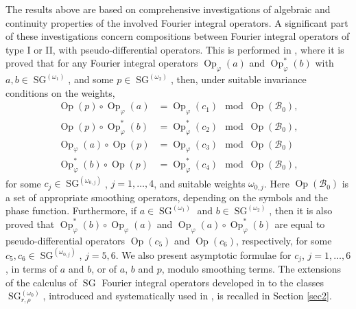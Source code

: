 \documentclass[12pt,a4paper,reqno]{amsart}
\numberwithin{equation}{section}
\numberwithin{thm}{section}
\theoremstyle{definition}
\theoremstyle{remark}
\begin{document}
\medskip

The results above are based on comprehensive investigations of algebraic and
continuity properties of the involved Fourier integral operators. A significant
part of these investigations concern compositions between Fourier integral
operators of type I or II, with pseudo-differential operators. This is performed in
\cite{CoTo2}, where it is proved that for any Fourier integral operators
${\operatorname{Op}} _{\varphi} (a)$ and ${\operatorname{Op}} _{\varphi} ^*(b)$  with $a,b\in {\operatorname{SG}} ^{(\omega _1)}$, and some
$p\in {\operatorname{SG}} ^{(\omega_2 )}$, then, under suitable invariance conditions on the weights,
\begin{align*}
{\operatorname{Op}} (p)\circ {\operatorname{Op}} _{\varphi} (a) &= {\operatorname{Op}} _{\varphi} (c_1) \mod {\operatorname{Op}} ({{\mathcal B}} _0),
\\[1ex]
{\operatorname{Op}} (p)\circ {\operatorname{Op}} _{\varphi} ^*(b) &= {\operatorname{Op}} _{\varphi} ^*(c_2) \mod {\operatorname{Op}} ({{\mathcal B}} _0),
\\[1ex]
{\operatorname{Op}} _{\varphi} (a) \circ {\operatorname{Op}} (p) &= {\operatorname{Op}} _{\varphi} (c_3) \mod {\operatorname{Op}} ({{\mathcal B}} _0)
\\[1ex]
{\operatorname{Op}} _{\varphi} ^*(b) \circ {\operatorname{Op}} (p) &= {\operatorname{Op}} _{\varphi} ^*(c_4) \mod {\operatorname{Op}} ({{\mathcal B}} _0),
\end{align*}
for some $c_j\in {\operatorname{SG}} ^{(\omega_{0,j})}$, $j=1,\dots ,4$, and suitable weights
$\omega_{0,j}$. Here ${\operatorname{Op}} ({{\mathcal B}} _0)$
is a set of appropriate smoothing operators, depending on the 
symbols and the phase function. Furthermore,
if $a\in {\operatorname{SG}} ^{(\omega _1)}$ and $b\in {\operatorname{SG}} ^{(\omega _2)}$, then it is also
proved that ${\operatorname{Op}} _{\varphi} ^*(b)\circ {\operatorname{Op}} _{\varphi} (a)$ and ${\operatorname{Op}} _{\varphi}(a)\circ {\operatorname{Op}} _{\varphi}^*
(b)$ are equal to pseudo-differential operators ${\operatorname{Op}} (c_5)$ and ${\operatorname{Op}} (c_6)$,
respectively, for some $c_5,c_6\in {\operatorname{SG}} ^{(\omega _{0,j})}$, $j=5,6$.
We also present asymptotic formulae for $c_j$, $j=1,\dots ,6$,
in terms of $a$ and $b$, or of
$a$, $b$ and $p$, modulo smoothing terms. The extensions of the
calculus of ${\operatorname{SG}}$ Fourier integral operators developed in \cite{coriasco} 
to the classes ${\operatorname{SG}}^{(\omega _0)}_{r,\rho}$,
introduced and systematically used in \cite{CJT1, CJT2, CJT3}, is recalled in
Section \ref{sec2}.
\end{document}
